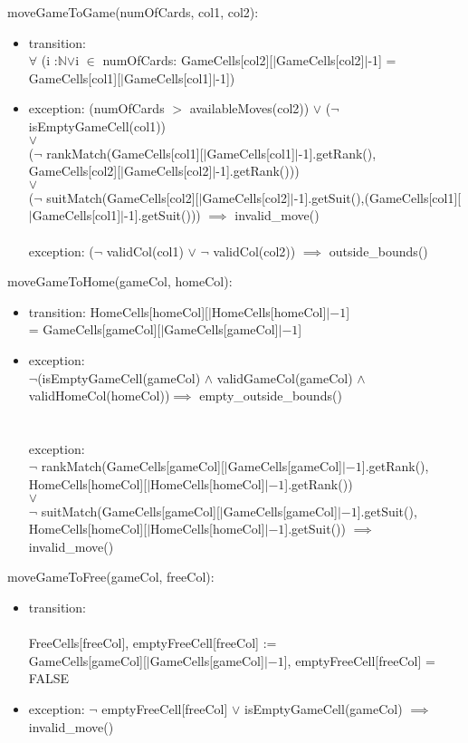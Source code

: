 \documentclass[12pt]{article}
\begin{document}
\noindent moveGameToGame(numOfCards, col1, col2):
\begin{itemize}
\item transition: \\$\forall$ (i :$\mathbb{N}$$\vee$i $\in$ numOfCards: GameCells[col2][$|$GameCells[col2]$|$-1] = GameCells[col1][$|$GameCells[col1]$|$-1])
\item exception: (numOfCards $>$ availableMoves(col2)) $\vee$ ($\lnot$ isEmptyGameCell(col1)) \\$\vee$ \\ 
($\lnot$ rankMatch(GameCells[col1][$|$GameCells[col1]$|$-1].getRank(), GameCells[col2][$|$GameCells[col2]$|$-1].getRank()))\\ $\vee$\\
($\lnot$ suitMatch(GameCells[col2][$|$GameCells[col2]$|$-1].getSuit(),(GameCells[col1][$|$GameCells[col1]$|$-1].getSuit()))
  $\implies$ invalid\_move()\\\\
 exception: ($\lnot$ validCol(col1) $\vee$ $\lnot$ validCol(col2)) $\implies$ outside\_bounds()
  
\end{itemize}

\noindent  moveGameToHome(gameCol, homeCol):
\begin{itemize}
\item transition: HomeCells[homeCol][$|$HomeCells[homeCol]$|-1$] \\= GameCells[gameCol][$|$GameCells[gameCol]$|-1$]
\item exception: \\$\lnot$(isEmptyGameCell(gameCol) $\wedge$ validGameCol(gameCol) $\wedge$ validHomeCol(homeCol))$\implies$ empty\_outside\_bounds()\\\\\\

exception: \\ $\lnot$ rankMatch(GameCells[gameCol][$|$GameCells[gameCol]$|-1$].getRank(),\\ HomeCells[homeCol][$|$HomeCells[homeCol]$|-1$].getRank())
\\ $\vee$ \\
$\lnot$ suitMatch(GameCells[gameCol][$|$GameCells[gameCol]$|-1$].getSuit(),\\ HomeCells[homeCol][$|$HomeCells[homeCol]$|-1$].getSuit()) $\implies$ invalid\_move()
\end{itemize}

\noindent moveGameToFree(gameCol, freeCol):
\begin{itemize}
\item transition:\\\\ FreeCells[freeCol], emptyFreeCell[freeCol] :=  \\GameCells[gameCol][$|$GameCells[gameCol]$|-1$],  emptyFreeCell[freeCol] = FALSE
\item exception: $\lnot$ emptyFreeCell[freeCol] $\vee$ isEmptyGameCell(gameCol) $\implies$ invalid\_move() \\
\end{itemize}
\end{document}
